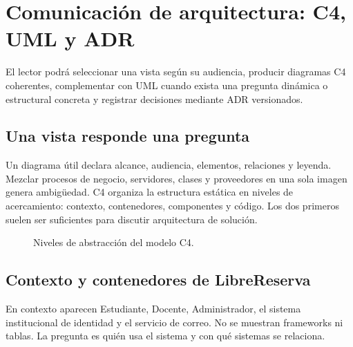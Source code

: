 \chapter{Comunicación de arquitectura: C4, UML y ADR}

\begin{objetivos}
El lector podrá seleccionar una vista según su audiencia, producir diagramas C4 coherentes, complementar con UML cuando exista una pregunta dinámica o estructural concreta y registrar decisiones mediante ADR versionados.
\end{objetivos}

\section{Una vista responde una pregunta}
Un diagrama útil declara alcance, audiencia, elementos, relaciones y leyenda. Mezclar procesos de negocio, servidores, clases y proveedores en una sola imagen genera ambigüedad. C4 organiza la estructura estática en niveles de acercamiento: contexto, contenedores, componentes y código. Los dos primeros suelen ser suficientes para discutir arquitectura de solución.

\begin{figure}[H]
\centering
{}
\caption{Niveles de abstracción del modelo C4.}
\label{fig:c4}
\end{figure}

\section{Contexto y contenedores de LibreReserva}
En contexto aparecen Estudiante, Docente, Administrador, el sistema institucional de identidad y el servicio de correo. No se muestran frameworks ni tablas. La pregunta es quién usa el sistema y con qué sistemas se relaciona.

